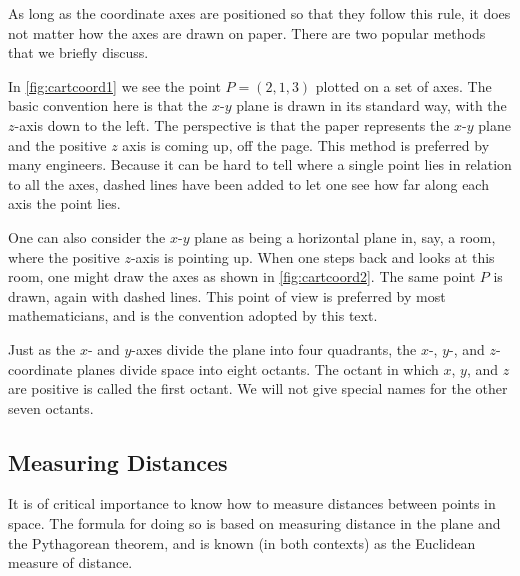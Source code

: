 As long as the coordinate axes are positioned so that they follow this rule, it does not matter how the axes are drawn on paper. There are two popular methods that we briefly discuss.

In \autoref{fig:cartcoord1} we see the point $P=(2,1,3)$ plotted on a set of axes. The basic convention here is that the $x$-$y$ plane is drawn in its standard way, with the $z$-axis down to the left. The perspective  is that the paper represents the $x$-$y$ plane and the positive $z$ axis is coming up, off the page. This method is preferred by many engineers. Because it can be hard to tell where a single point lies in relation to all the axes, dashed lines have been added to let one see how far along each axis the point lies.

One can also consider the $x$-$y$ plane as being a horizontal plane in, say, a room, where the positive $z$-axis is pointing up. When one steps back and looks at this room, one might draw the axes as shown in \autoref{fig:cartcoord2}. The same point $P$ is drawn, again with dashed lines. This point of view is preferred by most mathematicians, and is the convention adopted by this text.

Just as the $x$- and $y$-axes divide the plane into four quadrants, the $x$-, $y$-, and $z$-coordinate planes divide space into eight octants.  The octant in which $x$, $y$, and $z$ are positive is called the first octant.  We will not give special names for the other seven octants.


\subsection{Measuring Distances}

It is of critical importance to know how to measure distances between points in space. The formula for doing so is based on measuring distance in the plane and the Pythagorean theorem, and is known (in both contexts) as the Euclidean measure of distance.

